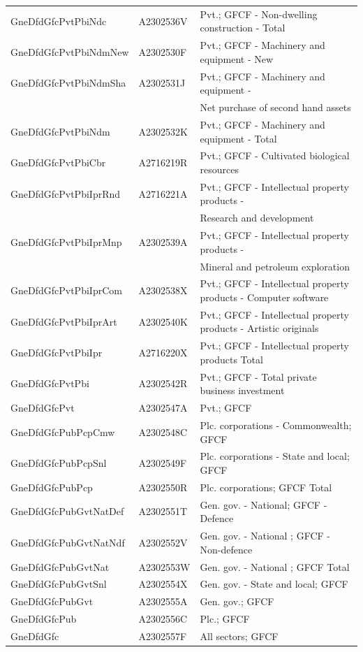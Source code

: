 \documentclass[graybox]{svmult}
\begin{document}
\begin{table}[H]
{\begin{tabular}[t]{lll}
			\addlinespace
			GneDfdGfcPvtPbiNdc & A2302536V & Pvt.; GFCF - Non-dwelling construction - Total\\
			GneDfdGfcPvtPbiNdmNew & A2302530F & Pvt.; GFCF - Machinery and equipment - New\\
			GneDfdGfcPvtPbiNdmSha & A2302531J & Pvt.; GFCF - Machinery and equipment -\\
			&  & Net purchase of second hand assets\\
			GneDfdGfcPvtPbiNdm & A2302532K & Pvt.; GFCF - Machinery and equipment - Total\\
			\addlinespace
			GneDfdGfcPvtPbiCbr & A2716219R & Pvt.; GFCF - Cultivated biological resources\\
			GneDfdGfcPvtPbiIprRnd & A2716221A & Pvt.; GFCF - Intellectual property products -\\
			&  & Research and development\\
			GneDfdGfcPvtPbiIprMnp & A2302539A & Pvt.; GFCF - Intellectual property products -\\
			&  & Mineral and petroleum exploration\\
			\addlinespace
			GneDfdGfcPvtPbiIprCom & A2302538X & Pvt.; GFCF - Intellectual property products - Computer software\\
			GneDfdGfcPvtPbiIprArt & A2302540K & Pvt.; GFCF - Intellectual property products - Artistic originals\\
			GneDfdGfcPvtPbiIpr & A2716220X & Pvt.; GFCF - Intellectual property products Total\\
			GneDfdGfcPvtPbi & A2302542R & Pvt.;  GFCF - Total private business investment\\
			GneDfdGfcPvt & A2302547A & Pvt.; GFCF\\
			\addlinespace
			GneDfdGfcPubPcpCmw & A2302548C & Plc. corporations - Commonwealth; GFCF\\
			GneDfdGfcPubPcpSnl & A2302549F & Plc. corporations - State and local; GFCF\\
			GneDfdGfcPubPcp & A2302550R & Plc. corporations; GFCF Total\\
			GneDfdGfcPubGvtNatDef & A2302551T & Gen. gov. - National; GFCF - Defence\\
			GneDfdGfcPubGvtNatNdf & A2302552V & Gen. gov. - National ; GFCF - Non-defence\\
			\addlinespace
			GneDfdGfcPubGvtNat & A2302553W & Gen. gov. - National ; GFCF Total\\
			GneDfdGfcPubGvtSnl & A2302554X & Gen. gov. - State and local; GFCF\\
			GneDfdGfcPubGvt & A2302555A & Gen. gov.; GFCF\\
			GneDfdGfcPub & A2302556C & Plc.; GFCF\\
			GneDfdGfc & A2302557F & All sectors; GFCF\\
			\bottomrule
		\end{tabular}
		
		\label{Tab:Expenditure-hierarchy-1}
	}
\end{table}
\end{document}
